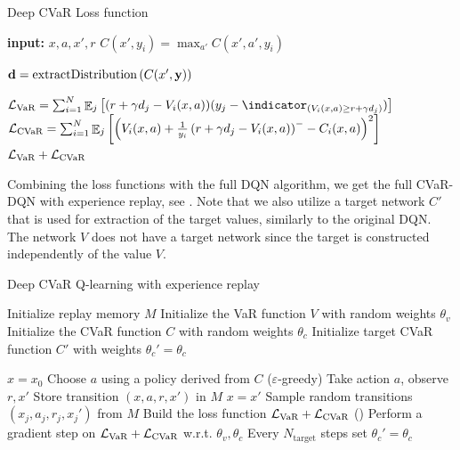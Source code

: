 \begin{algorithm}
\caption{Deep CVaR Loss function}
\begin{algorithmic}\label{alg:cvardqnloss}

    \STATE \textbf{input:} $x, a, x', r$
    \bindent
	\STATE $C(x', y_i) = \max_{a'} C(x', a', y_i)$
	\ENDFOR
	
	\STATE $\mathbf{d}= \text{extractDistribution}\left( {C(x', \mathbf{y})} \right)$

	
	\STATE $\mathcal{L}_{\var}=\sum_{i=1}^{N} \expect_j\bsquare{(r + \gamma d_j - V_i(x, a))(y_j - \indicator_{(V_i(x, a) \ge r + \gamma d_j)})}$
	\STATE $\mathcal{L}_{\text{CVaR}}=\sum_{i=1}^{N} \mathop{\mathbb{E}}_j\left[ {\left( {V_i(x, a) + \frac{1}{y_i} \left( {r + \gamma d_j - V_i(x, a)} \right)^- - C_i(x, a)} \right)^2} \right]$
	\eindent
	\RETURN $\mathcal{L}_{\text{VaR}} + \mathcal{L}_{\text{CVaR}}$
	
\end{algorithmic}
\end{algorithm}

Combining the loss functions with the full DQN algorithm, we get the full CVaR-DQN with experience replay, see . Note that we also utilize a target network $C'$ that is used for extraction of the target values, similarly to the original DQN. The network $V$ does not have a target network since the target is constructed independently of the value $V$.
\begin{algorithm}
\caption{Deep CVaR Q-learning with experience replay}
\begin{algorithmic}\label{alg:cvardqn}

    \STATE Initialize replay memory $M$
    \STATE Initialize the VaR function $V$ with random weights $\theta_v$
    \STATE Initialize the CVaR function $C$ with random weights $\theta_c$
    \STATE Initialize target CVaR function $C'$ with weights $\theta_c'=\theta_c$

    \STATE $x=x_0$
	\STATE Choose $a$ using a policy derived from $C$ ($\varepsilon$-greedy)
	\STATE Take action $a$, observe $r, x'$
	\STATE Store transition $(x, a, r, x')$ in $M$
	\STATE $x = x'$
	\STATE Sample random transitions $(x_j, a_j, r_j, x_j')$ from $M$
	\STATE Build the loss function $\mathcal{L}_{\text{VaR}} + \mathcal{L}_{\text{CVaR}}$ ()
    \STATE Perform a gradient step on $\mathcal{L}_{\text{VaR}} + \mathcal{L}_{\text{CVaR}}$ w.r.t. $\theta_v, \theta_c$
    \STATE Every $N_\text{target}$ steps set $\theta_c'=\theta_c$
	\ENDWHILE
	\ENDFOR
	
\end{algorithmic}
\end{algorithm}

